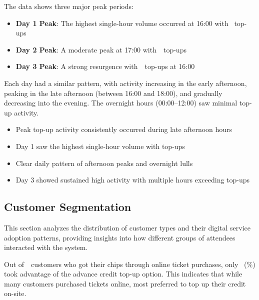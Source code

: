 The data shows three major peak periods:
\begin{itemize}
	\item \textbf{Day 1 Peak}: The highest single-hour volume occurred at 16:00 with ~top-ups
	\item \textbf{Day 2 Peak}: A moderate peak at 17:00 with~~top-ups
	\item \textbf{Day 3 Peak}: A strong resurgence with~~top-ups at 16:00
\end{itemize}

Each day had a similar pattern, with activity increasing in the early afternoon, peaking in the late afternoon (between 16:00 and 18:00), and gradually decreasing into the evening.
The overnight hours (00:00–12:00) saw minimal top-up activity.

\begin{keytakeaways}
	\begin{itemize}
		\item Peak top-up activity consistently occurred during late afternoon hours
		\item Day 1 saw the highest single-hour volume with  top-ups
		\item Clear daily pattern of afternoon peaks and overnight lulls
		\item Day 3 showed sustained high activity with multiple hours exceeding  top-ups
	\end{itemize}
\end{keytakeaways}


\subsection{Customer Segmentation}
\label{subsec:analysis-customer-segmentation}

This section analyzes the distribution of customer types and their digital service adoption patterns, providing insights into how different groups of attendees interacted with the system.


Out of~~customers who got their chips through online ticket purchases, only ~(\%) took advantage of the advance credit top-up option.
This indicates that while many customers purchased tickets online, most preferred to top up their credit on-site.

